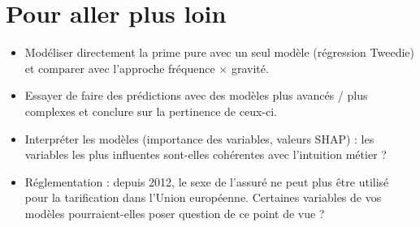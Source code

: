 \documentclass[a4paper,11pt]{article}
\begin{document}
	\section*{Pour aller plus loin}
	\begin{itemize}
		\item Modéliser directement la prime pure avec un seul modèle (régression Tweedie) et comparer avec l'approche fréquence $\times$ gravité.
		\item Essayer de faire des prédictions avec des modèles plus avancés / plus complexes et conclure sur la pertinence de ceux-ci.
		\item Interpréter les modèles (importance des variables, valeurs SHAP) : les variables les plus influentes sont-elles cohérentes avec l'intuition métier ?
		\item Réglementation : depuis 2012, le sexe de l'assuré ne peut plus être utilisé pour la tarification dans l'Union européenne. Certaines variables de vos modèles pourraient-elles poser question de ce point de vue ?
	\end{itemize}
	
\end{document}
